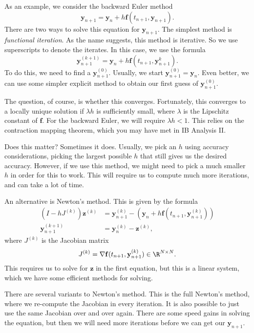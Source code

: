 \documentclass[a4paper]{article}
\begin{document}
As an example, we consider the backward Euler method
\[
  \mathbf{y}_{n + 1} = \mathbf{y}_n + h \mathbf{f}(t_{n + 1}, \mathbf{y}_{n + 1}).
\]
There are two ways to solve this equation for $\mathbf{y}_{n + 1}$. The simplest method is \emph{functional iteration}. As the name suggests, this method is iterative. So we use superscripts to denote the iterates. In this case, we use the formula
\[
  \mathbf{y}_{n + 1}^{(k + 1)} = \mathbf{y}_n + h \mathbf{f}(t_{n + 1}, \mathbf{y}_{n + 1}^{k}).
\]
To do this, we need to find a $\mathbf{y}_{n + 1}^{(0)}$. Usually, we start $\mathbf{y}_{n + 1}^{(0)} = \mathbf{y}_n$. Even better, we can use some simpler explicit method to obtain our first guess of $\mathbf{y}_{n + 1}^{(0)}$.

The question, of course, is whether this converges. Fortunately, this converges to a locally unique solution if $\lambda h$ is sufficiently small, where $\lambda$ is the Lipschitz constant of $\mathbf{f}$. For the backward Euler, we will require $\lambda h < 1$. This relies on the contraction mapping theorem, which you may have met in IB Analysis II.

Does this matter? Sometimes it does. Usually, we pick an $h$ using accuracy considerations, picking the largest possible $h$ that still gives us the desired accuracy. However, if we use this method, we might need to pick a much smaller $h$ in order for this to work. This will require us to compute much more iterations, and can take a lot of time.

An alternative is Newton's method. This is given by the formula
\begin{align*}
  (I - hJ^{(k)}) \mathbf{z}^{(k)} &= \mathbf{y}_{n + 1}^{(k)} - (\mathbf{y}_n + h \mathbf{f}(t_{n + 1}, \mathbf{y}_{n + 1}^{(k)}))\\
  \mathbf{y}_{n + 1}^{(k + 1)} &= \mathbf{y}_n^{(k)} - \mathbf{z}^{(k)},
\end{align*}
where $J^{(k)}$ is the Jacobian matrix
\[
  J^{(k)} = \nabla \mathbf{f}(t_{n + 1}, \mathbf{y}_{n + 1}^{(k)}) \in \R^{N \times N}.
\]
This requires us to solve for $\mathbf{z}$ in the first equation, but this is a linear system, which we have some efficient methods for solving.

There are several variants to Newton's method. This is the full Newton's method, where we re-compute the Jacobian in every iteration. It is also possible to just use the same Jacobian over and over again. There are some speed gains in solving the equation, but then we will need more iterations before we can get our $\mathbf{y}_{n + 1}$.
\end{document}
